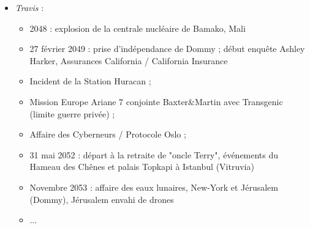 \documentclass[11pt,twoside,a4paper]{article}
\begin{document}
\begin{multicols*}{2}
\begin{itemize}
\begin{itemize}
		\item F{\'e}vrier 2056 : vendetta, mort de Dario Fulci ; 
		\item 4 mars 2056 : ouragan en Corse (affaire de Cambre) ; 
		\item Suite 2056 : J{\'e}rusalem, Gazdrom, Dommy ; 
		\item Avril 2056 : mission en pays Dogon / Mali ; centre de Bandiagara, centrale nucl{\'e}aire de la Faya ; 
		\item 17 avril 2056 : attentat nucl{\'e}aire {\`a} Londres, quartier de Westminster (50 000 morts, 300 000 bless{\'e}s) ; revendiqu{\'e} par le groupe "a nuclear error" ; 
		\item 20 avril 2056 : ch{\^a}teau de Neuschwanstein, crypte du projet Centaure ; entrevue de Christina Ivanov {\`a} Zurich par juge Karpov ; 
		\item ...
	\end{itemize} %
	
	\item \emph{Travis} :
	\begin{itemize}
		\item 2048 : explosion de la centrale nucl{\'e}aire de Bamako, Mali
		\item 27 f{\'e}vrier 2049 : prise d'ind{\'e}pendance de Dommy ; d{\'e}but enqu{\^e}te Ashley Harker, Assurances California / California Insurance
		\item Incident de la Station Huracan ; 
		\item Mission Europe Ariane 7 conjointe Baxter\&Martin avec Transgenic (limite guerre priv{\'e}e) ; 
		\item Affaire des Cyberneurs / Protocole Oslo ; 
		\item 31 mai 2052 : d{\'e}part {\`a} la retraite de "oncle Terry", {\'e}v{\'e}nements du Hameau des Ch{\^e}nes et palais Topkapi {\`a} Istanbul (Vitruvia)
		\item Novembre 2053 : affaire des eaux lunaires,  New-York et J{\'e}rusalem (Dommy), J{\'e}rusalem envahi de drones
		\item ...
	\end{itemize} %
	

\end{itemize}
\end{multicols*}
\end{document}
